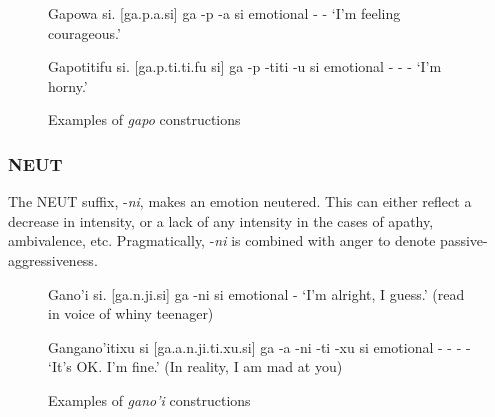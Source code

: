 			\begin{figure}[H] %
			\label{interlin_emo_prim}

				\begin{example}
				\label{ex:interlin_emo_prim_1}
					Gapowa si. [ga.\stress p\OO.\W a.si]
					\gll ga -{p\OO} -\W a si
					emotional - - \cop
					\glt `I'm feeling courageous.'
					\glend
				\end{example}

				\begin{example}
				\label{ex:interlin_emo_prim_2}
					Gapotitifu si. [ga.\stress p\OO.ti.ti.fu si]
					\gll ga -{p\OO} -titi -\F u si
					emotional - - -\D{targ:null} \cop
					\glt `I'm horny.'
					\glend
				\end{example}

			\caption{Examples of \emph{gapo} constructions}
			\end{figure}

		\subsubsection{NEUT}
			The NEUT suffix, -\emph{n\OO\glot i}, makes an emotion neutered. This can either reflect a decrease in intensity, or a lack of any intensity in the cases of apathy, ambivalence, etc. Pragmatically, -\emph{n\OO\glot i} is combined with anger to denote passive-aggressiveness.

			\begin{figure}[H] %
			\label{interlin_emo_neut}

				\begin{example}
				\label{ex:interlin_emo_neut_1}
					Gano'i si. [ga.\stress n\OO.ji.si]
					\gll ga -n\OO\glot i si
					emotional -\D{neut} \cop
					\glt `I'm alright, I guess.' (read in voice of whiny teenager)
					\glend
				\end{example}

				\begin{example}
				\label{ex:interlin_emo_neut_2}
					Gangano'itixu si [ga.\stress\N a.n\OO.ji.ti.xu.si]
					\gll ga -\N a -n\OO\glot i -ti -xu si
					emotional - - - -\D{targ:anim} \cop
					\glt `It's OK. I'm fine.' (In reality, I am mad at you)
					\glend
				\end{example}

			\caption{Examples of \emph{gano'i} constructions}
			\end{figure}

